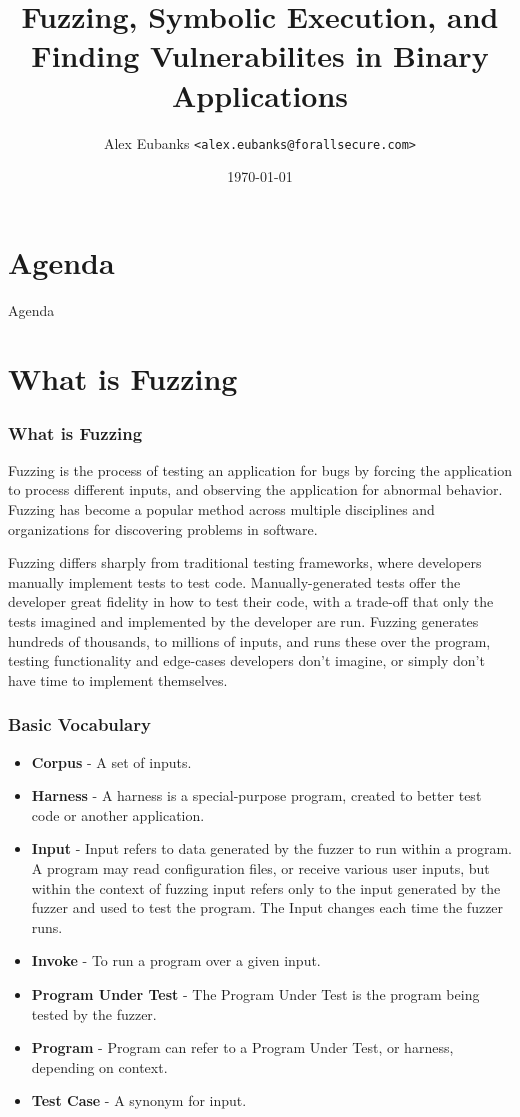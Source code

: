 \documentclass{beamer}
\title{Fuzzing, Symbolic Execution, and Finding Vulnerabilites in Binary Applications}
\date{\today}
\author[Eubanks]{Alex Eubanks \texttt{<alex.eubanks@forallsecure.com>}}
\begin{document}
\begin{frame}
\titlepage
\end{frame}

\section{Agenda}

\begin{frame}{Agenda}
\setlength{\parskip}{0cm}
\tableofcontents
\end{frame}

\section{What is Fuzzing}

\begin{frame}
\frametitle{What is Fuzzing}
Fuzzing is the process of testing an application for bugs by forcing the application to process different inputs, and observing the application for abnormal behavior. Fuzzing has become a popular method across multiple disciplines and organizations for discovering problems in software.
\par
Fuzzing differs sharply from traditional testing frameworks, where developers manually implement tests to test code. Manually-generated tests offer the developer great fidelity in how to test their code, with a trade-off that only the tests imagined and implemented by the developer are run. Fuzzing generates hundreds of thousands, to millions of inputs, and runs these over the program, testing functionality and edge-cases developers don't imagine, or simply don't have time to implement themselves.
\end{frame}

\begin{frame}
\frametitle{Basic Vocabulary}
\begin{itemize}
  \item \textbf{Corpus} - A set of inputs.
  \item \textbf{Harness} - A harness is a special-purpose program, created to better test code or another application.
  \item \textbf{Input} - Input refers to data generated by the fuzzer to run within a program. A program may read configuration files, or receive various user inputs, but within the context of fuzzing input refers only to the input generated by the fuzzer and used to test the program. The Input changes each time the fuzzer runs.
  \item \textbf{Invoke} - To run a program over a given input.
  \item \textbf{Program Under Test} - The Program Under Test is the program being tested by the fuzzer.
  \item \textbf{Program} - Program can refer to a Program Under Test, or harness, depending on context.
  \item \textbf{Test Case} - A synonym for input.
\end{itemize}
\end{frame}
\end{document}
